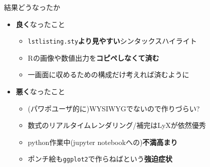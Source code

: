 \documentclass[
  12pt,
  ignorenonframetext,
]{beamer}
\providecommand{\tightlist}{%
  \setlength{\itemsep}{0pt}\setlength{\parskip}{0pt}}
\begin{document}
\begin{frame}[fragile]{結果どうなったか}
\protect\hypertarget{ux7d50ux679cux3069ux3046ux306aux3063ux305fux304b}{}

\begin{itemize}
\tightlist
\item
  \textbf{良く}なったこと

  \begin{itemize}
  \tightlist
  \item
    \texttt{lstlisting.sty}\textbf{より見やすい}シンタックスハイライト
  \item
    Rの画像や数値出力を\textbf{コピペしなくて済む}
  \item
    一画面に収めるための構成だけ考えれば済むように
  \end{itemize}
\item
  \textbf{悪く}なったこと

  \begin{itemize}
  \tightlist
  \item
    (パワポユーザ的に)WYSIWYGでないので作りづらい?
  \item
    数式のリアルタイムレンダリング/補完はLyXが依然優秀
  \item
    python作業中(jupyter notebookへの)\textbf{不満高まり}
  \item
    ポンチ絵も\texttt{ggplot2}で作らねばという\textbf{強迫症状}
  \end{itemize}
\end{itemize}

\end{frame}
\end{document}
